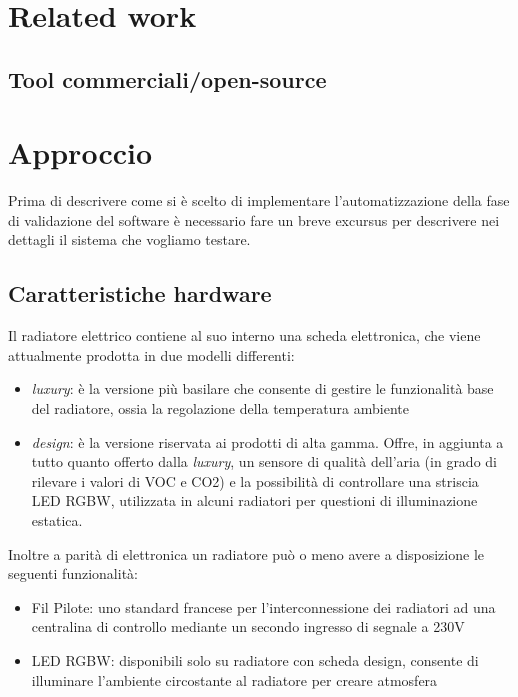 \documentclass[a4paper,titlepage]{article}
\begin{document}
\section{Related work}
\subsection{Tool commerciali/open-source}


\section{Approccio}

Prima di descrivere come si è scelto di implementare l'automatizzazione della fase
di validazione del software è necessario fare un breve excursus per descrivere nei
dettagli il sistema che vogliamo testare.

\subsection{Caratteristiche hardware}

Il radiatore elettrico contiene al suo interno una scheda elettronica, che viene
attualmente prodotta in due modelli differenti:
\begin{itemize}
    \item \textit{luxury}: è la versione più basilare che consente di gestire le
        funzionalità base del radiatore, ossia la regolazione della temperatura ambiente
    \item \textit{design}: è la versione riservata ai prodotti di alta gamma. Offre, in
        aggiunta a tutto quanto offerto dalla \textit{luxury}, un sensore di qualità
        dell'aria (in grado di rilevare i valori di VOC e CO2) e la possibilità di
        controllare una striscia LED RGBW, utilizzata in alcuni radiatori per questioni
        di illuminazione estatica.
\end{itemize}

Inoltre a parità di elettronica un radiatore può o meno avere a disposizione le
seguenti funzionalità:
\begin{itemize}
    \item Fil Pilote: uno standard francese per l'interconnessione dei radiatori ad una
        centralina di controllo mediante un secondo ingresso di segnale a 230V
    \item LED RGBW: disponibili solo su radiatore con scheda design, consente di
        illuminare l'ambiente circostante al radiatore per creare atmosfera
\end{itemize}
\end{document}
